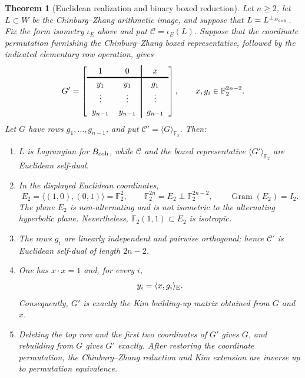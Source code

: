 \documentclass[12pt]{article}
\newtheorem{theorem}{Theorem}[section]
\newenvironment{blueblock}{\begingroup\color{blue}}{\endgroup}
\begin{document}
\begin{theorem}[Euclidean realization and binary boxed reduction]
\label{thm:binary-cz-kim}
Let \(n\ge2\), let \(L\subset W\) be the Chinburg--Zhang arithmetic image,
and suppose that \(L=L^{\perp_{B_{\rm coh}}}\). Fix the form isometry
\(\iota_E\) above and put \(\mathcal C=\iota_E(L)\). Suppose that the coordinate
permutation furnishing the Chinburg--Zhang boxed representative, followed by
the indicated elementary row operation, gives
\[
G'=
\begingroup
\setlength{\arraycolsep}{6pt}
\renewcommand{\arraystretch}{1.2}
\left[
\begin{array}{cc!{\vrule width 1.2pt}c}
1&0&x\\
\noalign{\hrule height 1.2pt}
y_1&y_1&g_1\\
\vdots&\vdots&\vdots\\
y_{n-1}&y_{n-1}&g_{n-1}
\end{array}
\right],
\endgroup
\qquad x,g_i\in\mathbb F_2^{2n-2}.
\]
Let \(G\) have rows \(g_1,\ldots,g_{n-1}\), and put
\(\mathcal C'=\langle G\rangle_{\mathbb F_2}\). Then:
\begin{enumerate}
\item \(L\) is Lagrangian for \(B_{\rm coh}\), while \(\mathcal C\) and the boxed
representative \(\langle G'\rangle_{\mathbb F_2}\) are Euclidean self-dual.
\item In the displayed Euclidean coordinates,
\[
E_2=\langle(1,0),(0,1)\rangle=\mathbb F_2^2,
\qquad
\mathbb F_2^{2n}=E_2\perp\mathbb F_2^{2n-2},
\qquad \operatorname{Gram}(E_2)=I_2.
\]
The plane \(E_2\) is non-alternating and is not isometric to the
alternating hyperbolic plane. Nevertheless,
\(\mathbb F_2(1,1)\subset E_2\) is isotropic.
\item The rows \(g_i\) are linearly independent and pairwise orthogonal;
hence \(\mathcal C'\) is Euclidean self-dual of length \(2n-2\).
\item One has \(x\cdot x=1\) and, for every \(i\),
\[
y_i=\langle x,g_i\rangle_{\rm E}.
\]
Consequently, \(G'\) is exactly the Kim building-up matrix obtained from
\(G\) and \(x\).
\item Deleting the top row and the first two coordinates of \(G'\) gives
\(G\), and rebuilding from \(G\) gives \(G'\) exactly. After restoring the
coordinate permutation, the Chinburg--Zhang reduction and Kim extension are
inverse up to permutation equivalence.
\end{enumerate}
\end{theorem}
\end{document}
